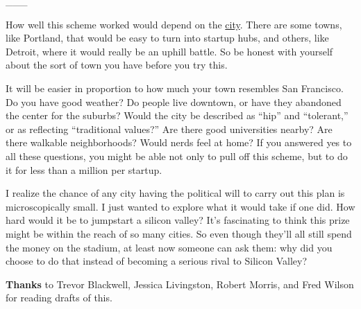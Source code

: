 \_\_\_

How well this scheme worked would depend on the
\href{cities.html}{city}. There are some towns, like Portland, that
would be easy to turn into startup hubs, and others, like Detroit, where
it would really be an uphill battle. So be honest with yourself about
the sort of town you have before you try this.

It will be easier in proportion to how much your town resembles San
Francisco. Do you have good weather? Do people live downtown, or have
they abandoned the center for the suburbs? Would the city be described
as ``hip'' and ``tolerant,'' or as reflecting ``traditional values?''
Are there good universities nearby? Are there walkable neighborhoods?
Would nerds feel at home? If you answered yes to all these questions,
you might be able not only to pull off this scheme, but to do it for
less than a million per startup.

I realize the chance of any city having the political will to carry out
this plan is microscopically small. I just wanted to explore what it
would take if one did. How hard would it be to jumpstart a silicon
valley? It's fascinating to think this prize might be within the reach
of so many cities. So even though they'll all still spend the money on
the stadium, at least now someone can ask them: why did you choose to do
that instead of becoming a serious rival to Silicon Valley?


\textbf{Thanks} to Trevor Blackwell, Jessica Livingston, Robert Morris,
and Fred Wilson for reading drafts of this.